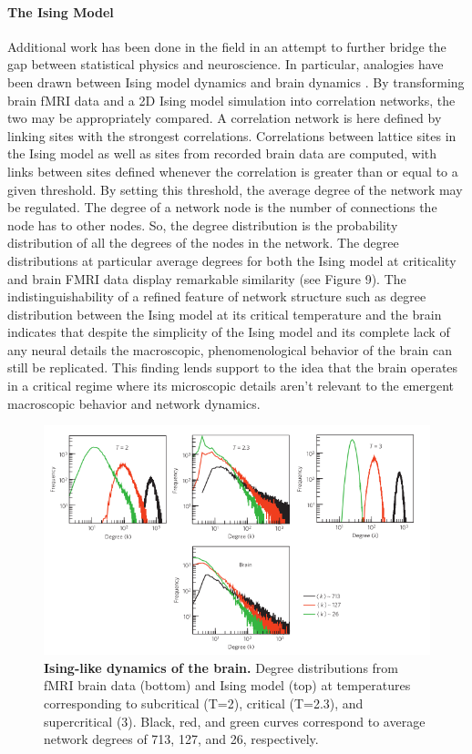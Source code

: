 \documentclass[12pt]{article}
\begin{document}
\paragraph{The Ising Model}
Additional work has been done in the field in an attempt to further bridge the gap between statistical physics and neuroscience. In particular, analogies have been drawn between Ising model dynamics and brain dynamics \cite{Fraiman2009a}. By transforming brain fMRI data and a 2D Ising model simulation into correlation networks, the two may be appropriately compared. A correlation network is here defined by linking sites with the strongest correlations. Correlations between lattice sites in the Ising model as well as sites from recorded brain data are computed, with links between sites defined whenever the correlation is greater than or equal to a given threshold. By setting this threshold, the average degree of the network may be regulated. The degree of a network node is the number of connections the node has to other nodes. So, the degree distribution is the probability distribution of all the degrees of the nodes in the network. The degree distributions at particular average degrees for both the Ising model at criticality and brain FMRI data display remarkable similarity (see Figure 9). The indistinguishability of a refined feature of network structure such as degree distribution between the Ising model at its critical temperature and the brain indicates that despite the simplicity of the Ising model and its complete lack of any neural details the macroscopic, phenomenological behavior of the brain can still be replicated. This finding lends support to the idea that the brain operates in a critical regime where its microscopic details aren't relevant to the emergent macroscopic behavior and network dynamics.

\begin{figure}      
  \begin{center}    
 \includegraphics[width=.8\textwidth]{isinglikedynamicschialvo}    
    \caption{\textbf{Ising-like dynamics of the brain.} Degree distributions from fMRI brain data (bottom) and Ising model (top) at temperatures corresponding to subcritical (T=2), critical (T=2.3), and supercritical (3). Black, red, and green curves correspond to average network degrees of 713, 127, and 26, respectively. \cite{Fraiman2009a}}   
   \label{Figure::Ising model and the brain at criticality}   
  \end{center}     
   \end{figure}
\end{document}

